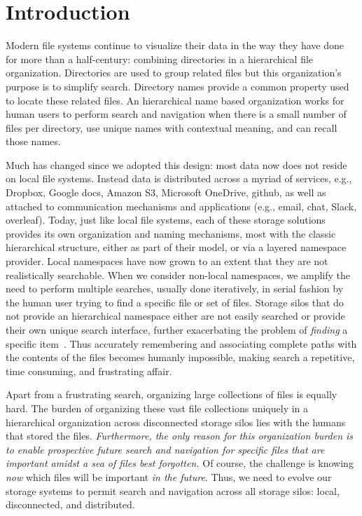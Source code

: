 \section{Introduction}\label{sec:intro}
Modern file systems continue to visualize their data in the way they have done for more than a half-century: 
combining directories in a hierarchical file organization. 
Directories are used to group related files but this organization's purpose is to simplify search. 
Directory names provide a common property used to locate these related files. 
An hierarchical name based organization works for human users to perform search and navigation when there is
a small number of files per directory, use unique names with contextual meaning, and can recall those names.

Much has changed since we adopted this design: most data now does not reside on local file systems.
Instead data is distributed across a myriad of services, e.g., Dropbox, Google docs, Amazon S3, Microsoft OneDrive, github, 
as well as attached to communication mechanisms and applications (e.g., email, chat, Slack, overleaf). 
Today, just like local file systems, each of these storage solutions provides its own organization and naming mechanisms, 
most with the classic hierarchical structure, either as part of their model, or via a layered namespace provider.
Local namespaces have now grown to an extent that they are not realistically searchable.  
When we consider non-local namespaces, we amplify the need to perform multiple searches, usually done
iteratively, in serial fashion by the human user trying to find a specific file or set of files.
Storage silos that do not provide an hierarchical namespace either are not easily searched or provide their own
unique search interface, further exacerbating the problem of \textit{finding} a specific item~\cite{bergman2019factors}. 
Thus accurately remembering and associating complete paths with the contents of the files becomes humanly
impossible, making search a repetitive, time consuming, and frustrating affair.

Apart from a frustrating search, organizing large collections of files is equally hard. The burden
of organizing these vast file collections uniquely in a hierarchical organization across 
disconnected storage silos lies with the humans that stored the files. \textit{Furthermore, the only
reason for this organization burden is to enable prospective future search and navigation for specific
files that are important amidst a sea of files best forgotten.}  Of course, the challenge is knowing
\textit{now} which files will be important \textit{in the future}.
Thus, we need to evolve our storage systems to permit search and navigation across all storage silos: 
local, disconnected, and distributed.

